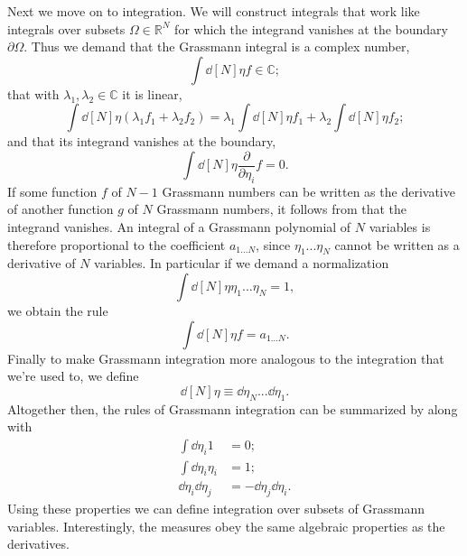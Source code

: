 Next we move on to integration. We will construct integrals that work like
integrals over subsets $\Omega\in\mathbb{R}^N$ for which 
the integrand vanishes at the boundary $\partial\Omega$. 
Thus we demand that the Grassmann integral is a complex number,
\begin{equation}
  \int\dd[N]{\eta}f\in\mathbb{C};
\end{equation}
that with $\lambda_1,\lambda_2\in\mathbb{C}$ it is linear,
\begin{equation}\label{eq:grasslin}
  \int\dd[N]{\eta}\left(\lambda_1f_1+\lambda_2f_2\right)
       =\lambda_1\int\dd[N]{\eta}f_1
         +\lambda_2\int\dd[N]{\eta}f_2;
\end{equation}
and that its integrand vanishes at the boundary,
\begin{equation}\label{eq:grassBC}
  \int\dd[N]{\eta}\frac{\partial}{\partial\eta_i}f=0.
\end{equation}
If some function $f$ of $N-1$ Grassmann numbers can be written as the 
derivative of another function $g$ of $N$ Grassmann numbers, it follows
from  that the integrand vanishes.
An integral of a Grassmann polynomial of $N$ variables is therefore
proportional to the coefficient $a_{1...N}$, since
$\eta_1...\eta_N$ cannot be written as a derivative of $N$ variables.
In particular if we demand a normalization
\begin{equation}\label{eq:grassnorm}
  \int\dd[N]{\eta}\eta_1...\eta_N=1,
\end{equation}
we obtain the rule
\begin{equation}
  \int\dd[N]{\eta}f=a_{1...N}.
\end{equation}
Finally to make Grassmann integration more analogous to the integration that
we're used to, we define
\begin{equation}
  \dd[N]{\eta}\equiv\dd{\eta_N}...\dd{\eta_1}.
\end{equation}
Altogether then, the rules of Grassmann integration can be summarized by
 along with
\begin{equation}\label{eq:grassintrules}\begin{aligned}
       \int\dd{\eta_i}1&=0;\\
  \int\dd{\eta_i}\eta_i&=1;\\
  \dd{\eta_i}\dd{\eta_j}&=-\dd{\eta_j}\dd{\eta_i}.
\end{aligned}\end{equation}
Using these properties we can define integration over subsets of Grassmann
variables. Interestingly, the measures obey the same algebraic properties as
the derivatives.

